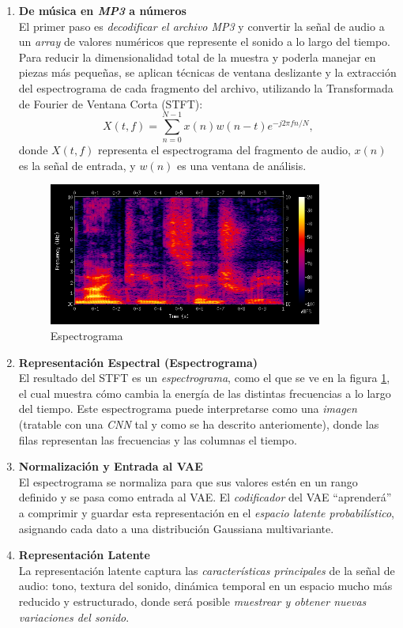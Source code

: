 \begin{enumerate}
    \item \textbf{De música en \emph{MP3} a números} \\
    El primer paso es \emph{decodificar el archivo MP3} y convertir la señal de audio a un \emph{array} de valores numéricos que represente el sonido a lo largo del tiempo. Para reducir la dimensionalidad total de la muestra y poderla manejar en piezas más pequeñas, se aplican técnicas de ventana deslizante y la extracción del espectrograma de cada fragmento del archivo, utilizando la Transformada de Fourier de Ventana Corta (STFT):
    \[
        X(t, f) = \sum_{n=0}^{N-1} x(n)w(n-t)e^{-j2\pi fn/N},
    \]
    donde $X(t, f)$ representa el espectrograma del fragmento de audio, $x(n)$ es la señal de entrada, y $w(n)$ es una ventana de análisis.

    \begin{figure}[H]
      \centering
      \includegraphics[width=0.85\textwidth]{images/espectrograma.png}
      \caption{Espectrograma}
      \label{fig:espectrograma}
    \end{figure}

    \item \textbf{Representación Espectral (Espectrograma)} \\
    El resultado del STFT es un \emph{espectrograma}, como el que se ve en la figura \ref{fig:espectrograma}, el cual muestra cómo cambia la energía de las distintas frecuencias a lo largo del tiempo. Este espectrograma puede interpretarse como una \emph{imagen} (tratable con una \emph{CNN} tal y como se ha descrito anteriomente), donde las filas representan las frecuencias y las columnas el tiempo.

    \item \textbf{Normalización y Entrada al VAE} \\
    El espectrograma se normaliza para que sus valores estén en un rango definido y se pasa como entrada al VAE. El \emph{codificador} del VAE ``aprenderá'' a comprimir y guardar esta representación en el \emph{espacio latente probabilístico}, asignando cada dato a una distribución Gaussiana multivariante.

    \item \textbf{Representación Latente} \\
    La representación latente captura las \emph{características principales} de la señal de audio: tono, textura del sonido, dinámica temporal en un espacio mucho más reducido y estructurado, donde será posible \emph{muestrear y obtener nuevas variaciones del sonido}.
\end{enumerate}

